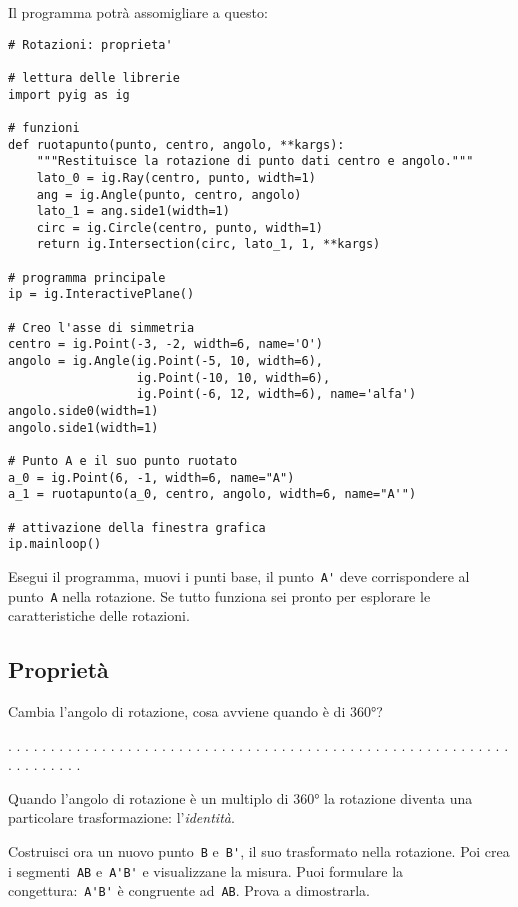 Il programma potrà assomigliare a questo:

\begin{lstlisting}
# Rotazioni: proprieta'

# lettura delle librerie
import pyig as ig

# funzioni
def ruotapunto(punto, centro, angolo, **kargs):
    """Restituisce la rotazione di punto dati centro e angolo."""
    lato_0 = ig.Ray(centro, punto, width=1)
    ang = ig.Angle(punto, centro, angolo)
    lato_1 = ang.side1(width=1)
    circ = ig.Circle(centro, punto, width=1)
    return ig.Intersection(circ, lato_1, 1, **kargs)
  
# programma principale
ip = ig.InteractivePlane()

# Creo l'asse di simmetria
centro = ig.Point(-3, -2, width=6, name='O')
angolo = ig.Angle(ig.Point(-5, 10, width=6),
                  ig.Point(-10, 10, width=6),
                  ig.Point(-6, 12, width=6), name='alfa')
angolo.side0(width=1)
angolo.side1(width=1)

# Punto A e il suo punto ruotato
a_0 = ig.Point(6, -1, width=6, name="A")
a_1 = ruotapunto(a_0, centro, angolo, width=6, name="A'")

# attivazione della finestra grafica
ip.mainloop()
\end{lstlisting}

Esegui il programma, muovi i punti base, il punto~\lstinline{A'} deve
corrispondere al punto~\lstinline{A} nella rotazione.
Se tutto funziona sei pronto per esplorare le caratteristiche delle
rotazioni.


\subsection{Proprietà}

Cambia l'angolo di rotazione, cosa avviene quando è di 360°?

. . . . . . . . . . . . . . . . . . . . . . . . . . . . . . . . . . . . . . . .
. . . . . . . . . . . . . . . . . . . . . . . . . . . .

Quando l'angolo di rotazione è un multiplo di 360° la rotazione diventa una
particolare trasformazione: l'\emph{identità}.

Costruisci ora un nuovo punto~\lstinline{B} e~\lstinline{B'}, il suo 
trasformato 
nella rotazione. 
Poi crea i segmenti~\lstinline{AB} e~\lstinline{A'B'} e visualizzane 
la misura.
Puoi formulare la congettura:~\lstinline{A'B'} è congruente ad~\lstinline{AB}.
Prova a dimostrarla.

